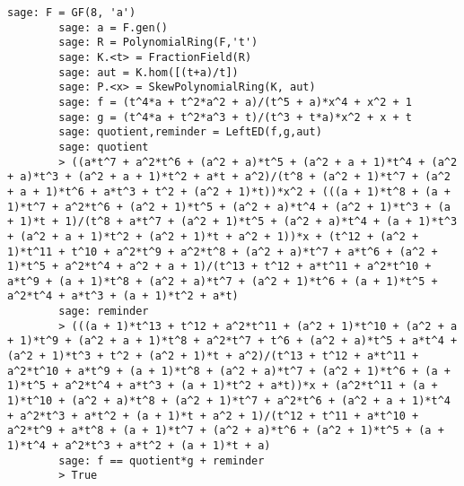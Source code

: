 \begin{description}[leftmargin=1em, font=\ttfamily, style=nextline]
    \begin{lstlisting}[gobble=8]
        sage: F = GF(8, 'a')
        sage: a = F.gen()
        sage: R = PolynomialRing(F,'t')
        sage: K.<t> = FractionField(R)
        sage: aut = K.hom([(t+a)/t])
        sage: P.<x> = SkewPolynomialRing(K, aut)
        sage: f = (t^4*a + t^2*a^2 + a)/(t^5 + a)*x^4 + x^2 + 1
        sage: g = (t^4*a + t^2*a^3 + t)/(t^3 + t*a)*x^2 + x + t
        sage: quotient,reminder = LeftED(f,g,aut)
        sage: quotient
        > ((a*t^7 + a^2*t^6 + (a^2 + a)*t^5 + (a^2 + a + 1)*t^4 + (a^2 + a)*t^3 + (a^2 + a + 1)*t^2 + a*t + a^2)/(t^8 + (a^2 + 1)*t^7 + (a^2 + a + 1)*t^6 + a*t^3 + t^2 + (a^2 + 1)*t))*x^2 + (((a + 1)*t^8 + (a + 1)*t^7 + a^2*t^6 + (a^2 + 1)*t^5 + (a^2 + a)*t^4 + (a^2 + 1)*t^3 + (a + 1)*t + 1)/(t^8 + a*t^7 + (a^2 + 1)*t^5 + (a^2 + a)*t^4 + (a + 1)*t^3 + (a^2 + a + 1)*t^2 + (a^2 + 1)*t + a^2 + 1))*x + (t^12 + (a^2 + 1)*t^11 + t^10 + a^2*t^9 + a^2*t^8 + (a^2 + a)*t^7 + a*t^6 + (a^2 + 1)*t^5 + a^2*t^4 + a^2 + a + 1)/(t^13 + t^12 + a*t^11 + a^2*t^10 + a*t^9 + (a + 1)*t^8 + (a^2 + a)*t^7 + (a^2 + 1)*t^6 + (a + 1)*t^5 + a^2*t^4 + a*t^3 + (a + 1)*t^2 + a*t)
        sage: reminder
        > (((a + 1)*t^13 + t^12 + a^2*t^11 + (a^2 + 1)*t^10 + (a^2 + a + 1)*t^9 + (a^2 + a + 1)*t^8 + a^2*t^7 + t^6 + (a^2 + a)*t^5 + a*t^4 + (a^2 + 1)*t^3 + t^2 + (a^2 + 1)*t + a^2)/(t^13 + t^12 + a*t^11 + a^2*t^10 + a*t^9 + (a + 1)*t^8 + (a^2 + a)*t^7 + (a^2 + 1)*t^6 + (a + 1)*t^5 + a^2*t^4 + a*t^3 + (a + 1)*t^2 + a*t))*x + (a^2*t^11 + (a + 1)*t^10 + (a^2 + a)*t^8 + (a^2 + 1)*t^7 + a^2*t^6 + (a^2 + a + 1)*t^4 + a^2*t^3 + a*t^2 + (a + 1)*t + a^2 + 1)/(t^12 + t^11 + a*t^10 + a^2*t^9 + a*t^8 + (a + 1)*t^7 + (a^2 + a)*t^6 + (a^2 + 1)*t^5 + (a + 1)*t^4 + a^2*t^3 + a*t^2 + (a + 1)*t + a)
        sage: f == quotient*g + reminder
        > True
    \end{lstlisting} 
\end{description}

